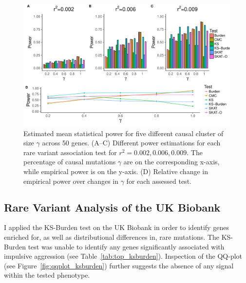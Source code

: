 \begin{figure}[ht!]
  \centering
  \includegraphics[width=1.0\linewidth]{ksburden/figures/combined_power_analysis.pdf}
  \caption[Estimated Mean Statistical Power]{Estimated mean statistical power for five different causal cluster of size $\gamma$ across 50 genes.
    (A--C) Different power estimations for each rare variant association test for $r^2=0.002, 0.006, 0.009$.
    The percentage of causal mutations $\gamma$ are on the corresponding x-axis, while empirical power is on the y-axis.
    (D) Relative change in empirical power over changes in $\gamma$ for each assessed test.\label{fig:simulatedGeneRealData}}
\end{figure}


\subsection{Rare Variant Analysis of the UK Biobank}
\label{sub:ukbiobank_aggression}

I applied the KS-Burden test on the UK Biobank in order to identify genes enriched for, as well as distributional differences in, rare mutations. 
The KS-Burden test was unable to identify any genes significantly associated with impulsive aggression (see Table~\ref{tab:top_ksburden}).
Inspection of the QQ-plot (see Figure~\ref{fig:qqplot_ksburden}) further suggests the absence of any signal within the tested phenotype.

